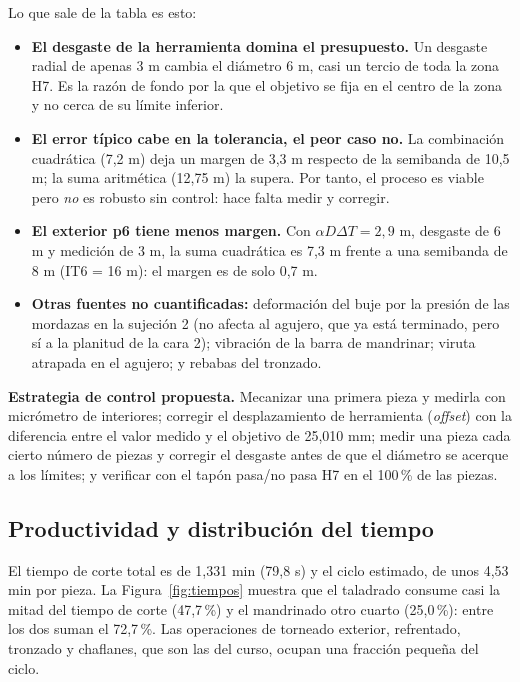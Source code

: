 \documentclass[12pt,a4paper]{article}
\begin{document}
Lo que sale de la tabla es esto:
\begin{itemize}
	\item \textbf{El desgaste de la herramienta domina el presupuesto.} Un
	      desgaste radial de apenas 3 \textmu m cambia el diámetro 6 \textmu m,
	      casi un tercio de toda la zona H7. Es la razón de fondo por la que el
	      objetivo se fija en el centro de la zona y no cerca de su límite
	      inferior.
	\item \textbf{El error típico cabe en la tolerancia, el peor caso no.} La
	      combinación cuadrática (7,2 \textmu m) deja un margen de 3,3 \textmu m
	      respecto de la semibanda de 10,5 \textmu m; la suma aritmética
	      (12,75 \textmu m) la supera. Por tanto, el proceso es viable pero
	      \emph{no} es robusto sin control: hace falta medir y corregir.
	\item \textbf{El exterior p6 tiene menos margen.} Con $\alpha D\Delta T=2{,}9$
	      \textmu m, desgaste de 6 \textmu m y medición de 3 \textmu m, la suma
	      cuadrática es 7,3 \textmu m frente a una semibanda de 8 \textmu m
	      (IT6 = 16 \textmu m): el margen es de solo 0,7 \textmu m.
	\item \textbf{Otras fuentes no cuantificadas:} deformación del buje por la
	      presión de las mordazas en la sujeción 2 (no afecta al agujero, que ya
	      está terminado, pero sí a la planitud de la cara 2); vibración de la
	      barra de mandrinar; viruta atrapada en el agujero; y rebabas del
	      tronzado.
\end{itemize}

\textbf{Estrategia de control propuesta.} Mecanizar una primera pieza y medirla
con micrómetro de interiores; corregir el desplazamiento de herramienta
(\emph{offset}) con la diferencia entre el valor medido y el objetivo de
25,010 mm; medir una pieza cada cierto número de piezas y corregir el desgaste
antes de que el diámetro se acerque a los límites; y verificar con el tapón
pasa/no pasa H7 en el 100\,\% de las piezas.

\subsection{Productividad y distribución del tiempo}

El tiempo de corte total es de 1,331 min (79,8 s) y el ciclo estimado, de unos
4,53 min por pieza. La Figura~\ref{fig:tiempos} muestra que el taladrado
consume casi la mitad del tiempo de corte (47,7\,\%) y el mandrinado otro cuarto
(25,0\,\%): entre los dos suman el 72,7\,\%. Las operaciones de torneado exterior,
refrentado, tronzado y chaflanes, que son las del curso, ocupan una fracción
pequeña del ciclo.
\end{document}
